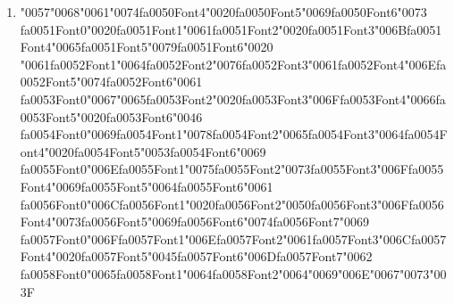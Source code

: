 \documentclass[12pt]{article}
\begin{document}
\begin{enumerate}[label=Q\arabic*.]
\begin{enumerate}[label=(\Alph*)]
    \item Encoder-only
    \item Decoder-only
    \item Encoder-decoder
    \item None
\end{enumerate}
\item {\char"0057}{\char"0068}{\char"0061}{\char"0074}{\csname fa0050Font4\endcsname\char"0020}{\csname fa0050Font5\endcsname\char"0069}{\csname fa0050Font6\endcsname\char"0073} {\csname fa0051Font0\endcsname\char"0020}{\csname fa0051Font1\endcsname\char"0061}{\csname fa0051Font2\endcsname\char"0020}{\csname fa0051Font3\endcsname\char"006B}{\csname fa0051Font4\endcsname\char"0065}{\csname fa0051Font5\endcsname\char"0079}{\csname fa0051Font6\endcsname\char"0020} {\char"0061}{\csname fa0052Font1\endcsname\char"0064}{\csname fa0052Font2\endcsname\char"0076}{\csname fa0052Font3\endcsname\char"0061}{\csname fa0052Font4\endcsname\char"006E}{\csname fa0052Font5\endcsname\char"0074}{\csname fa0052Font6\endcsname\char"0061} {\csname fa0053Font0\endcsname\char"0067}{\char"0065}{\csname fa0053Font2\endcsname\char"0020}{\csname fa0053Font3\endcsname\char"006F}{\csname fa0053Font4\endcsname\char"0066}{\csname fa0053Font5\endcsname\char"0020}{\csname fa0053Font6\endcsname\char"0046} {\csname fa0054Font0\endcsname\char"0069}{\csname fa0054Font1\endcsname\char"0078}{\csname fa0054Font2\endcsname\char"0065}{\csname fa0054Font3\endcsname\char"0064}{\csname fa0054Font4\endcsname\char"0020}{\csname fa0054Font5\endcsname\char"0053}{\csname fa0054Font6\endcsname\char"0069} {\csname fa0055Font0\endcsname\char"006E}{\csname fa0055Font1\endcsname\char"0075}{\csname fa0055Font2\endcsname\char"0073}{\csname fa0055Font3\endcsname\char"006F}{\csname fa0055Font4\endcsname\char"0069}{\csname fa0055Font5\endcsname\char"0064}{\csname fa0055Font6\endcsname\char"0061} {\csname fa0056Font0\endcsname\char"006C}{\csname fa0056Font1\endcsname\char"0020}{\csname fa0056Font2\endcsname\char"0050}{\csname fa0056Font3\endcsname\char"006F}{\csname fa0056Font4\endcsname\char"0073}{\csname fa0056Font5\endcsname\char"0069}{\csname fa0056Font6\endcsname\char"0074}{\csname fa0056Font7\endcsname\char"0069} {\csname fa0057Font0\endcsname\char"006F}{\csname fa0057Font1\endcsname\char"006E}{\csname fa0057Font2\endcsname\char"0061}{\csname fa0057Font3\endcsname\char"006C}{\csname fa0057Font4\endcsname\char"0020}{\csname fa0057Font5\endcsname\char"0045}{\csname fa0057Font6\endcsname\char"006D}{\csname fa0057Font7\endcsname\char"0062} {\csname fa0058Font0\endcsname\char"0065}{\csname fa0058Font1\endcsname\char"0064}{\csname fa0058Font2\endcsname\char"0064}{\char"0069}{\char"006E}{\char"0067}{\char"0073}{\char"003F}

\end{enumerate}
\end{document}
